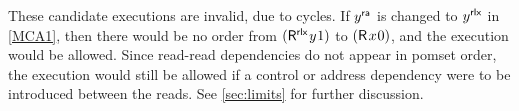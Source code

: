 These candidate executions are invalid, due to cycles.
If $y^{\mathsf{ra}}$ is changed to $y^{\mathsf{rlx}}$ in \ref{MCA1}, then there would be no order
from $(\DR[\modeRLX]{y}{1})$ to $(\DR{x}{0})$, and the execution would be
allowed.  Since read-read dependencies do not appear in pomset order, the
execution would still be allowed if a control or address dependency were to
be introduced between the reads. See \textsection\ref{sec:limits} for further
discussion.



